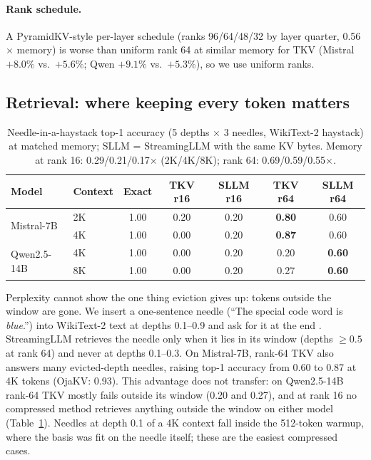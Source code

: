 \documentclass{article}
\begin{document}
\paragraph{Rank schedule.} A PyramidKV-style \citep{pyramidkv2024} per-layer
schedule (ranks 96/64/48/32 by layer quarter, 0.56$\times$ memory) is worse
than uniform rank 64 at similar memory for TKV (Mistral $+8.0\%$ vs.\ $+5.6\%$;
Qwen $+9.1\%$ vs.\ $+5.3\%$), so we use uniform ranks.

\subsection{Retrieval: where keeping every token matters}
\label{sec:retrieval}

\begin{table}[t]
\centering
\caption{Needle-in-a-haystack top-1 accuracy (5 depths $\times$ 3 needles,
WikiText-2 haystack) at matched memory; SLLM = StreamingLLM with the same KV
bytes. Memory at rank 16: 0.29/0.21/0.17$\times$ (2K/4K/8K); rank 64:
0.69/0.59/0.55$\times$.}
\label{tab:niah}
\small
\begin{tabular}{llccccc}
\toprule
Model & Context & Exact & TKV r16 & SLLM r16 & TKV r64 & SLLM r64 \\
\midrule
\multirow{2}{*}{Mistral-7B}  & 2K & 1.00 & 0.20 & 0.20 & \textbf{0.80} & 0.60 \\
                             & 4K & 1.00 & 0.00 & 0.20 & \textbf{0.87} & 0.60 \\
\midrule
\multirow{2}{*}{Qwen2.5-14B} & 4K & 1.00 & 0.00 & 0.20 & 0.20 & \textbf{0.60} \\
                             & 8K & 1.00 & 0.00 & 0.20 & 0.27 & \textbf{0.60} \\
\bottomrule
\end{tabular}
\end{table}

Perplexity cannot show the one thing eviction gives up: tokens outside the
window are gone. We insert a one-sentence needle (``The special code word is
\emph{blue}.'') into WikiText-2 text at depths 0.1--0.9 and ask for it at the
end \citep{niah2023}. StreamingLLM retrieves the needle only when it lies in its
window (depths $\ge 0.5$ at rank 64) and never at depths 0.1--0.3. On
Mistral-7B, rank-64 TKV also answers many evicted-depth needles, raising top-1
accuracy from 0.60 to 0.87 at 4K tokens (OjaKV: 0.93). This advantage does not
transfer: on Qwen2.5-14B rank-64 TKV mostly fails outside its window (0.20 and
0.27), and at rank 16 no compressed method retrieves anything outside the
window on either model (Table~\ref{tab:niah}). Needles at depth 0.1 of a 4K
context fall inside the 512-token warmup, where the basis was fit on the
needle itself; these are the easiest compressed cases.
\end{document}
